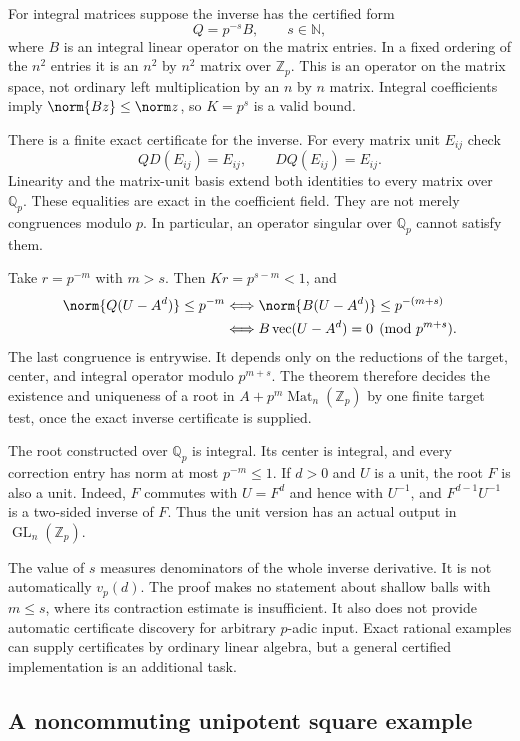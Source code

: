 For integral matrices suppose the inverse has the certified form
\[
 Q=p^{-s}B,\qquad s\in\mathbb N,
\]
where $B$ is an integral linear operator on the matrix entries. In a fixed
ordering of the $n^2$ entries it is an $n^2$ by $n^2$ matrix over
$\mathbb Z_p$. This is an operator on the matrix space, not ordinary
left multiplication by an $n$ by $n$ matrix. Integral coefficients imply
$\norm{Bz}\le\norm z$, so $K=p^s$ is a valid bound.

There is a finite exact certificate for the inverse. For every matrix unit
$E_{ij}$ check
\[
 QD(E_{ij})=E_{ij},\qquad DQ(E_{ij})=E_{ij}.
\]
Linearity and the matrix-unit basis extend both identities to every matrix
over $\mathbb Q_p$. These equalities are exact in the coefficient field.
They are not merely congruences modulo $p$. In particular, an operator
singular over $\mathbb Q_p$ cannot satisfy them.

Take $r=p^{-m}$ with $m>s$. Then $Kr=p^{s-m}<1$, and
\begin{align}
 \norm{Q(U-A^d)}\le p^{-m}
 &\Longleftrightarrow \norm{B(U-A^d)}\le p^{-(m+s)}\notag\\
 &\Longleftrightarrow
 B\operatorname{vec}(U-A^d)=0\pmod {p^{m+s}}.
 \label{eq:appendix-finite-criterion}
\end{align}
The last congruence is entrywise. It depends only on the reductions of the
target, center, and integral operator modulo $p^{m+s}$. The theorem
therefore decides the existence and uniqueness of a root in
$A+p^m\operatorname{Mat}_n(\mathbb Z_p)$ by one finite target test, once
the exact inverse certificate is supplied.

The root constructed over $\mathbb Q_p$ is integral. Its center is
integral, and every correction entry has norm at most $p^{-m}\le1$.
If $d>0$ and $U$ is a unit, the root $F$ is also a unit. Indeed, $F$
commutes with $U=F^d$ and hence with $U^{-1}$, and
$F^{d-1}U^{-1}$ is a two-sided inverse of $F$. Thus the unit version has
an actual output in $\operatorname{GL}_n(\mathbb Z_p)$.

The value of $s$ measures denominators of the whole inverse derivative.
It is not automatically $v_p(d)$. The proof makes no statement about
shallow balls with $m\le s$, where its contraction estimate is insufficient.
It also does not provide automatic certificate discovery for arbitrary
$p$-adic input. Exact rational examples can supply certificates by ordinary
linear algebra, but a general certified implementation is an additional
task.

\subsection{A noncommuting unipotent square example}

